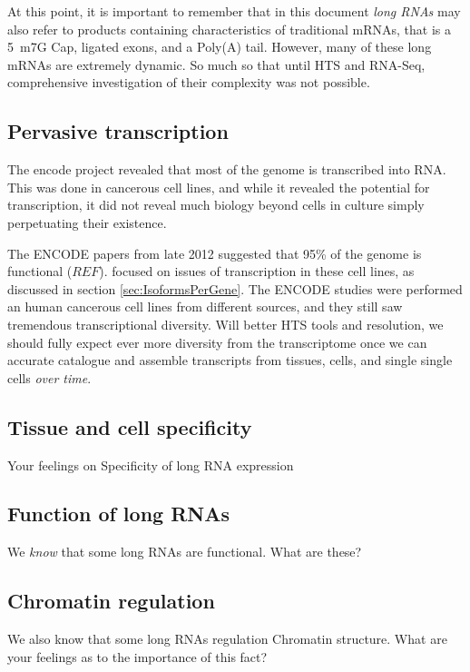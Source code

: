 
  At this point, it is important to remember that in this document \textit{long RNAs} may also refer to products containing characteristics of traditional mRNAs, that is a 5\textprime~m7G Cap, ligated exons, and a Poly(A) tail. However, many of these long mRNAs are extremely dynamic. So much so that until HTS and RNA-Seq, comprehensive investigation of their complexity was not possible.

  \subsection{Pervasive transcription}

    The encode project revealed that most of the genome is transcribed into RNA. This was done in cancerous cell lines, and while it revealed the potential for transcription, it did not reveal much biology beyond cells in culture simply perpetuating their existence. 

    The ENCODE papers from late 2012 suggested that 95\% of the genome is functional ($REF$). \citet{Djebali2012} focused on issues of transcription in these cell lines, as discussed in section \ref{sec:IsoformsPerGene}. The ENCODE studies were performed an human cancerous cell lines from different sources, and they still saw tremendous transcriptional diversity. Will better HTS tools and resolution, we should fully expect ever more diversity from the transcriptome once we can accurate catalogue and assemble transcripts from tissues, cells, and single single cells \textit{over time}.

  \subsection{Tissue and cell specificity}
    Your feelings on Specificity of long RNA expression

  \subsection{Function of long RNAs}
    We \textit{know} that some long RNAs are functional. What are these?

  \subsection{Chromatin regulation}
    We also know that some long RNAs regulation Chromatin structure. What are your feelings as to the importance of this fact?

